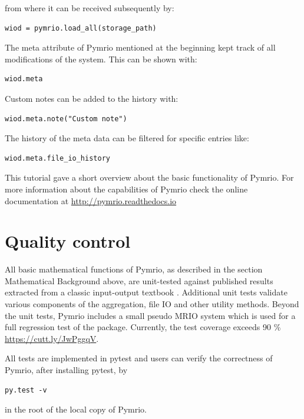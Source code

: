 \documentclass{jors}
\begin{document}
from where it can be received subsequently by:

\begin{lstlisting}
wiod = pymrio.load_all(storage_path)
\end{lstlisting}

The meta attribute of Pymrio mentioned at the beginning kept track of all modifications of the system.
This can be shown with:

\begin{lstlisting}
wiod.meta
\end{lstlisting}

Custom notes can be added to the history with:
\begin{lstlisting}
wiod.meta.note("Custom note")
\end{lstlisting}


The history of the meta data can be filtered for specific entries like:

\begin{lstlisting}
wiod.meta.file_io_history
\end{lstlisting}


This tutorial gave a short overview about the basic functionality of Pymrio. 
For more information about the capabilities of Pymrio check the online documentation at 
\url{http://pymrio.readthedocs.io} 
\cite{stadler2018}



\section*{Quality control}

All basic mathematical functions of Pymrio, as described in the section Mathematical Background above, are unit-tested against published results extracted from a classic input-output textbook \cite{miller2009}.
Additional unit tests validate various components of the aggregation, file IO and other utility methods.
Beyond the unit tests, Pymrio includes a small pseudo MRIO system which is used for a full regression test of the package. Currently, the test coverage exceeds 90 \% \url{https://cutt.ly/JwPggqV}. 

All tests are implemented in pytest \cite{krekl2017} and users can verify the correctness of Pymrio, after installing pytest, by

\begin{lstlisting}
py.test -v
\end{lstlisting}

in the root of the local copy of Pymrio.
\end{document}
